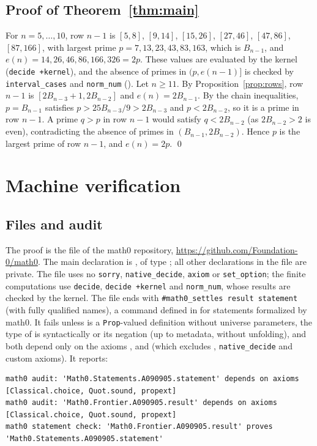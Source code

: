 \documentclass[11pt]{amsart}
\theoremstyle{plain}
\theoremstyle{definition}
\begin{document}
\subsection{Proof of Theorem~\ref{thm:main}}
For $n=5,\dots,10$, row $n-1$ is $[5,8]$, $[9,14]$, $[15,26]$, $[27,46]$, $[47,86]$, $[87,166]$, with largest prime $p=7,13,23,43,83,163$, which is $B_{n-1}$, and $e(n)=14,26,46,86,166,326=2p$. These values are evaluated by the kernel (\texttt{decide +kernel}), and the absence of primes in $(p,e(n-1)]$ is checked by \texttt{interval\_cases} and \texttt{norm\_num} (). Let $n\ge11$. By Proposition~\ref{prop:rows}, row $n-1$ is $[2B_{n-3}+1,2B_{n-2}]$ and $e(n)=2B_{n-1}$. By the chain inequalities, $p=B_{n-1}$ satisfies $p>25B_{n-3}/9>2B_{n-3}$ and $p<2B_{n-2}$, so it is a prime in row $n-1$. A prime $q>p$ in row $n-1$ would satisfy $q<2B_{n-2}$ (as $2B_{n-2}>2$ is even), contradicting the absence of primes in $(B_{n-1},2B_{n-2})$. Hence $p$ is the largest prime of row $n-1$, and $e(n)=2p$. \qed

\section{Machine verification}\label{sec:lean}

\subsection*{Files and audit}
The proof is the file  of the math0 repository, \url{https://github.com/Foundation-0/math0}. The main declaration is , of type ; all other declarations in the file are private. The file uses no \texttt{sorry}, \texttt{native\_decide}, \texttt{axiom} or \texttt{set\_option}; the finite computations use \texttt{decide}, \texttt{decide +kernel} and \texttt{norm\_num}, whose results are checked by the kernel. The file ends with \lstinline|#math0_settles result statement| (with fully qualified names), a command defined in  for statements formalized by math0. It fails unless  is a \texttt{Prop}-valued definition without universe parameters, the type of  is syntactically  or its negation (up to metadata, without unfolding), and both depend only on the axioms ,  and  (which excludes , \texttt{native\_decide} and custom axioms). It reports:
\begin{lstlisting}[basicstyle=\ttfamily\scriptsize,belowskip=0pt]
math0 audit: 'Math0.Statements.A090905.statement' depends on axioms [Classical.choice, Quot.sound, propext]
math0 audit: 'Math0.Frontier.A090905.result' depends on axioms [Classical.choice, Quot.sound, propext]
math0 statement check: 'Math0.Frontier.A090905.result' proves 'Math0.Statements.A090905.statement'
\end{lstlisting}
\end{document}
